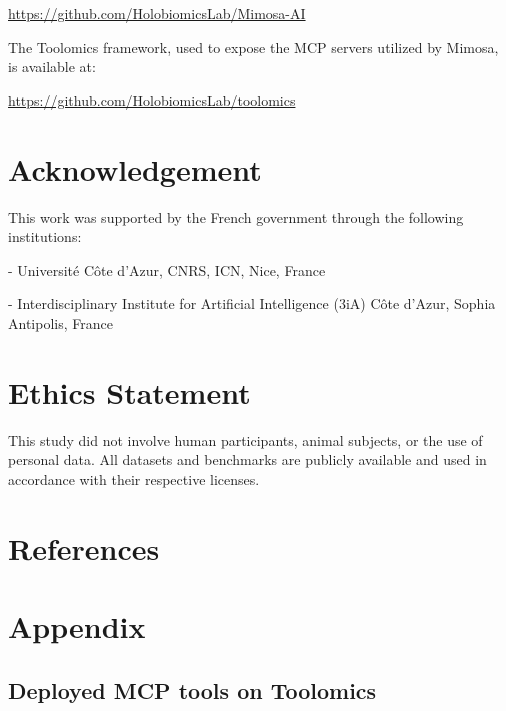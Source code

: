 \documentclass{article}
\begin{document}
\begin{center}
  \url{https://github.com/HolobiomicsLab/Mimosa-AI}
\end{center}

The Toolomics framework, used to expose the MCP servers utilized by Mimosa, is available at:

\begin{center}
  \url{https://github.com/HolobiomicsLab/toolomics}
\end{center}

\section{Acknowledgement}

This work was supported by the French government through the following institutions:

- Université Côte d’Azur, CNRS, ICN, Nice, France

- Interdisciplinary Institute for Artificial Intelligence (3iA) Côte d’Azur, Sophia Antipolis, France

\section{Ethics Statement}

This study did not involve human participants, animal subjects, or the use of personal data. All datasets and benchmarks are publicly available and used in accordance with their respective licenses.

\section{References}




\section{Appendix}

\subsection{Deployed MCP tools on Toolomics}
\end{document}
